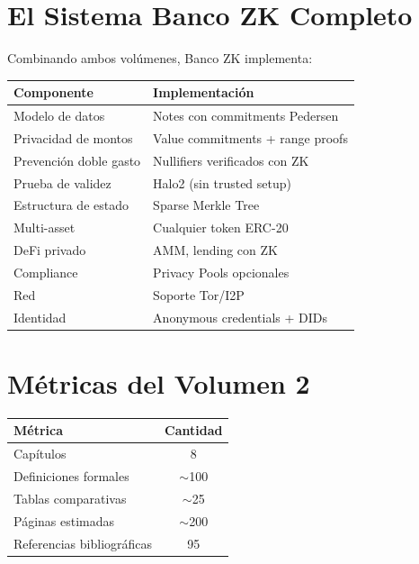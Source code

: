 \documentclass[11pt,a4paper,twoside]{book}
\begin{document}
\section*{El Sistema Banco ZK Completo}

Combinando ambos vol\'umenes, Banco ZK implementa:

\begin{center}
\begin{tabular}{ll}
\toprule
\textbf{Componente} & \textbf{Implementaci\'on} \\
\midrule
Modelo de datos & Notes con commitments Pedersen \\
Privacidad de montos & Value commitments + range proofs \\
Prevenci\'on doble gasto & Nullifiers verificados con ZK \\
Prueba de validez & Halo2 (sin trusted setup) \\
Estructura de estado & Sparse Merkle Tree \\
Multi-asset & Cualquier token ERC-20 \\
DeFi privado & AMM, lending con ZK \\
Compliance & Privacy Pools opcionales \\
Red & Soporte Tor/I2P \\
Identidad & Anonymous credentials + DIDs \\
\bottomrule
\end{tabular}
\end{center}

\section*{M\'etricas del Volumen 2}

\begin{center}
\begin{tabular}{lc}
\toprule
\textbf{M\'etrica} & \textbf{Cantidad} \\
\midrule
Cap\'itulos & 8 \\
Definiciones formales & $\sim$100 \\
Tablas comparativas & $\sim$25 \\
P\'aginas estimadas & $\sim$200 \\
Referencias bibliogr\'aficas & 95 \\
\bottomrule
\end{tabular}
\end{center}

\vspace{1cm}
\end{document}
